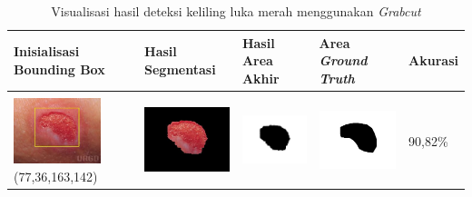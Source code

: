 \begin{table}[H]
	\centering
	\caption{Visualisasi hasil deteksi keliling luka merah menggunakan \emph{Grabcut}}
	\label{tabel_hasil_10}
	\begin{tabular}{|m{1.0in}|m{1.0in}|m{1.0in}|m{1.0in}|m{0.6in}|}
		\hline
		\textbf{Inisialisasi Bounding Box} & \textbf{Hasil Segmentasi} & \textbf{Hasil Area Akhir} & \textbf{Area \emph{Ground Truth}} & \textbf{Akurasi} \\
		\hline
		
		&  &  & \\
		\includegraphics[width=1.0in]{gambar/hasil_segmentasi/luka_merah/image_32_rect.jpg} {\centering\fontsize{10}{10}\selectfont(77,36,163,142)}&
		\includegraphics[width=1.0in]{gambar/hasil_segmentasi/luka_merah/result_32.jpg}&
		\includegraphics[width=1.0in]{gambar/hasil_segmentasi/luka_merah/mask_r_32.jpg}&
		\includegraphics[width=1.0in]{gambar/hasil_segmentasi/luka_merah/32_r.jpg}&
		90,82\% \\
		\hline


\end{tabular}
\end{table}
